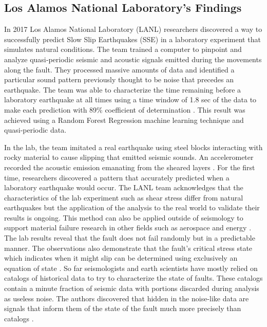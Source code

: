 \documentclass[]{llncs} %
\begin{document}
\subsection{Los Alamos National Laboratory's Findings}
In 2017 Los Alamos National Laboratory (LANL) researchers discovered a way to successfully predict Slow Slip Earthquakes (SSE) in a laboratory experiment that simulates natural conditions. The team trained a computer to pinpoint and analyze quasi‐periodic seismic and acoustic signals emitted during the movements along the fault. They processed massive amounts of data and identified a particular sound pattern previously thought to be noise that precedes an earthquake. The team was able to characterize the time remaining before a laboratory earthquake at all times using a time window of 1.8 sec of the data to make each prediction with 89\% coefficient of determination \cite{LANLNews}. This result was achieved using a Random Forest Regression machine learning technique and quasi‐periodic data. \par

In the lab, the team imitated a real earthquake using steel blocks interacting with rocky material to cause slipping that emitted seismic sounds. An accelerometer recorded the acoustic emission emanating from the sheared layers \cite{LANLNews}. For the first time, researchers discovered a pattern that accurately predicted when a laboratory earthquake would occur. The LANL team acknowledges that the characteristics of the lab experiment such as shear stress differ from natural earthquakes but the application of the analysis to the real world to validate their results is ongoing. This method can also be applied outside of seismology to support material failure research in other fields such as aerospace and energy \cite{LANLNews}. The lab results reveal that the fault does not fail randomly but in a predictable manner. The observations also demonstrate that the fault’s critical stress state which indicates when it might slip can be determined using exclusively an equation of state \cite{LANLNews}. So far seismologists and earth scientists have mostly relied on catalogs of historical data to try to characterize the state of faults. These catalogs contain a minute fraction of seismic data with portions discarded during analysis as useless noise. The authors discovered that hidden in the noise-like data are signals that inform them of the state of the fault much more precisely than catalogs \cite{LANLNews}. \par
\end{document}
